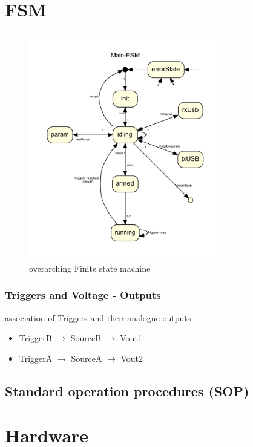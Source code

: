 \documentclass[master,english,smartquotes,apa]{hgbthesis}
\begin{document}
		\section{FSM}
		\begin{figure}[H]
			\center
			\includegraphics[width=0.75\textwidth]{src/_mainFSM_neato.pdf}
			\caption{overarching Finite state machine}
			\label{fig:FSM}
		\end{figure}


	

		\subsubsection{Triggers and Voltage - Outputs}
		association of Triggers and their analogue outputs
		\begin{itemize}
			\item TriggerB $\rightarrow$ SourceB $\rightarrow$ Vout1
			\item TriggerA $\rightarrow$ SourceA $\rightarrow$ Vout2
		\end{itemize}
		\subsection{Standard operation procedures (SOP)}
		{	\scriptsize
			
		}

		\section{Hardware}
\end{document}
